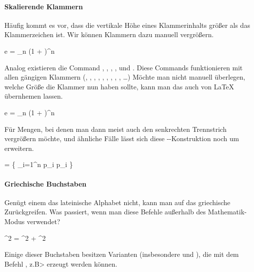 \paragraph{Skalierende Klammern} Häufig kommt es vor, dass die vertikale Höhe eines Klammerinhalts größer als das Klammerzeichen ist.
Wir können Klammern dazu manuell vergrößern.
\begin{latexlisting}
	e = \lim_{n \to \infty} \bigl(1 +  \bigr)^n
\end{latexlisting}
Analog existieren die Command , , , ,  und .
Diese Commands funktionieren mit allen gängigen Klammern (\key{[}, \key{]}, \latexcommand{\{}, \latexcommand{\}}, , , \latexcommand{\|}, \latexcommand{\|}, \key{|}, \dots)
Möchte man nicht manuell überlegen, welche Größe die Klammer nun haben sollte, kann man das auch von \LaTeX{} übernhemen lassen.
\begin{latexlisting}
	e = \lim_{n \to \infty} \left(1 +  \right)^n
\end{latexlisting}
Für Mengen, bei denen man dann meist auch den senkrechten Trennstrich vergrößern möchte, und ähnliche Fälle lässt sich diese --Konstruktion noch um  erweitern.
\begin{latexlisting}
	 = \left\{ \prod_{i=1}^n p_i \middle \mid p_i \in {} \right\}
\end{latexlisting}

\paragraph{Griechische Buchstaben} Genügt einem das lateinische Alphabet nicht, kann man auf das griechische Zurückgreifen.
Was passiert, wenn man diese Befehle außerhalb des Mathematik-Modus verwendet?
\begin{latexlisting}
	\alpha^2 = \beta^2 + \gamma^2 \qquad \omega \neq \Omega
\end{latexlisting}
Einige dieser Buchstaben besitzen Varianten (insbesondere  und ), die mit dem Befehl , z.B>  erzeugt werden können.


